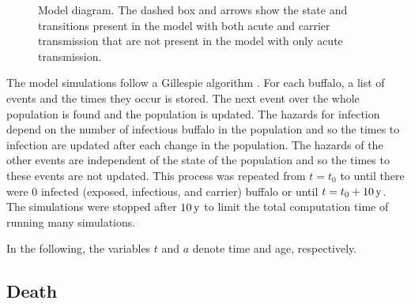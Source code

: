\documentclass[12pt, USenglish]{article}  %
\begin{document}
\begin{figure}
  \centering
  \textsf{}
  \caption{Model diagram. The dashed box and arrows show the
    state and transitions present in the model with both acute and
    carrier transmission that are not present in the model with only
    acute transmission.}
  \label{fig:diagram}
\end{figure}


The model simulations follow a Gillespie algorithm
\autocite{gillespie_1977}. For each buffalo, a list of events and the
times they occur is stored. The next event over the whole population
is found and the population is updated.  The hazards for infection
depend on the number of infectious buffalo in the population and so
the times to infection are updated after each change in the
population.  The hazards of the other events are independent of the
state of the population and so the times to these events are not
updated.  This process was repeated from $t = t_0$ to until there were
$0$ infected (exposed, infectious, and carrier) buffalo or until
$t = t_0 + \unit[10]{y}$. The simulations were stopped after
$\unit[10]{y}$ to limit the total computation time of running many
simulations.

In the following, the variables $t$ and $a$ denote time and age,
respectively.

\subsection{Death}
\end{document}
